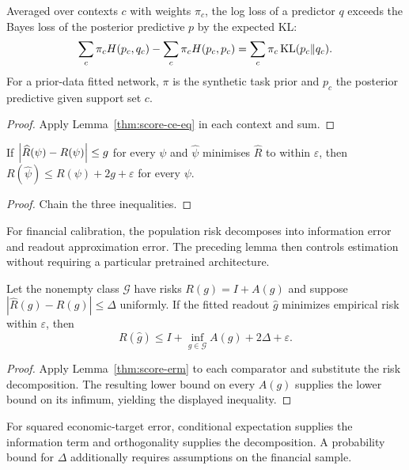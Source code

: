 \begin{theorem}\label{thm:score-pretraining}
  \leanok
  Averaged over contexts $c$ with weights $\pi_c$, the log loss of a predictor
  $q$ exceeds the Bayes loss of the posterior predictive $p$ by the expected KL:
  \[
    \sum_c\pi_cH(p_c,q_c)-\sum_c\pi_cH(p_c,p_c)=\sum_c\pi_c\operatorname{KL}(p_c\Vert q_c).
  \]
  For a prior-data fitted network, $\pi$ is the synthetic task prior and $p_c$
  the posterior predictive given support set $c$.
\end{theorem}
\begin{proof}\leanok
  Apply Lemma~\ref{thm:score-ce-eq} in each context and sum.
\end{proof}

\begin{lemma}\label{thm:score-erm}
  \leanok
  If $\left\lvert\widehat R(\psi)-R(\psi)\right\rvert\le g$ for every $\psi$ and $\widehat\psi$
  minimises $\widehat R$ to within $\varepsilon$, then
  $R(\widehat\psi)\le R(\psi)+2g+\varepsilon$ for every $\psi$.
\end{lemma}
\begin{proof}\leanok
  Chain the three inequalities.
\end{proof}

For financial calibration, the population risk decomposes into information
error and readout approximation error. The preceding lemma then controls
estimation without requiring a particular pretrained architecture.
\begin{theorem}\label{thm:score-calibrated}
  \leanok
  Let the nonempty class $\mathcal G$ have risks $R(g)=I+A(g)$ and suppose
  $|\widehat R(g)-R(g)|\le\Delta$ uniformly. If the fitted readout
  $\widehat g$ minimizes empirical risk within $\varepsilon$, then
  \[
    R(\widehat g)\le I+\inf_{g\in\mathcal G}A(g)+2\Delta+\varepsilon.
  \]
\end{theorem}
\begin{proof}\leanok
  Apply Lemma~\ref{thm:score-erm} to each comparator and substitute the risk
  decomposition. The resulting lower bound on every $A(g)$ supplies the lower
  bound on its infimum, yielding the displayed inequality.
\end{proof}
For squared economic-target error, conditional expectation supplies the
information term and orthogonality supplies the decomposition. A probability
bound for $\Delta$ additionally requires assumptions on the financial sample.

